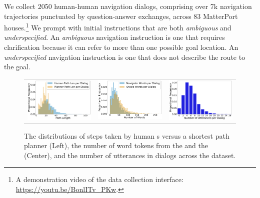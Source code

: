 We collect 2050 human-human navigation dialogs, comprising over 7k navigation trajectories punctuated by question-answer exchanges, across 83 MatterPort~\cite{chang:3dv17} houses.\footnote{A demonstration video of the data collection interface: \url{https://youtu.be/BonlITv_PKw}.}
We prompt with initial instructions that are both \textit{ambiguous} and \textit{underspecified}.
An \textit{ambiguous} navigation instruction is one that requires clarification because it can refer to more than one possible goal location.
An \textit{underspecified} navigation instruction is one that does not describe the route to the goal.

\begin{figure}[ht]
\begin{tabular}{ccc}
    \includegraphics[width=0.3\columnwidth]{figures/player_planner_steps_per_dialog.pdf} &
    \includegraphics[width=0.3\columnwidth]{figures/nav_ora_words_per_dialog.pdf} &
    \includegraphics[width=0.3\columnwidth]{figures/utterances_per_dialog.pdf}
\end{tabular}
\caption{The distributions of steps taken by human \nav{}s versus a shortest path planner (Left), the number of word tokens from the \nav{} and the \ora{} (Center), and the number of utterances in dialogs across the \dataset{} dataset.}
\label{fig:steps_and_words}
\vspace{-4mm}
\end{figure}

